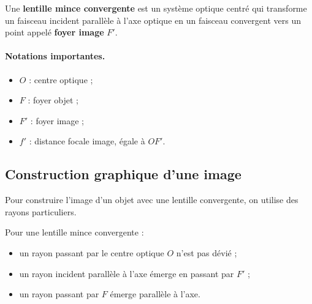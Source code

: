 \documentclass[11pt,a4paper]{article}
\begin{document}
\begin{definitionbox}
Une \textbf{lentille mince convergente} est un système optique centré qui transforme un faisceau incident parallèle à l'axe optique en un faisceau convergent vers un point appelé \textbf{foyer image} $F'$.
\end{definitionbox}

\paragraph{Notations importantes.}
\begin{itemize}
    \item $O$ : centre optique ;
    \item $F$ : foyer objet ;
    \item $F'$ : foyer image ;
    \item $f'$ : distance focale image, égale à $OF'$.
\end{itemize}

\begin{center}
\end{center}

\subsection{Construction graphique d'une image}
Pour construire l'image d'un objet avec une lentille convergente, on utilise des rayons particuliers.

\begin{propriete}
Pour une lentille mince convergente :
\begin{itemize}
    \item un rayon passant par le centre optique $O$ n'est pas dévié ;
    \item un rayon incident parallèle à l'axe émerge en passant par $F'$ ;
    \item un rayon passant par $F$ émerge parallèle à l'axe.
\end{itemize}
\end{propriete}
\end{document}
